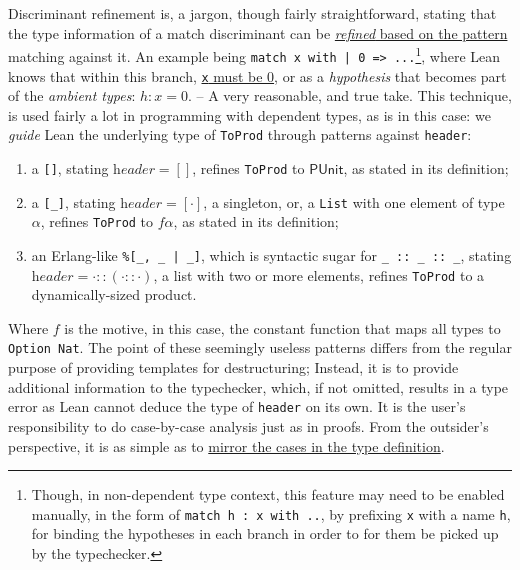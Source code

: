 \documentclass[a4paper, 11pt]{article}
\theoremstyle{remark}\newtheorem*{remark}{Remark}
\theoremstyle{definition}\newtheorem*{definition}{Definition}
\begin{document}
Discriminant refinement is, a jargon, though fairly straightforward,
stating that the type information of a match discriminant can be \underline{\emph{refined} based on the pattern}
matching against it. An example being \texttt{match x with | 0 => ...}\footnote{
Though, in non-dependent type context, this feature may need to be enabled manually, in the form of
\texttt{match h : x with ..}, by prefixing \texttt{x} with a name \texttt{h},
for binding the hypotheses in each branch
in order to for them be picked up by the typechecker.
},
where Lean knows
that within this branch, \underline{\texttt{x} must be 0}, or as a \emph{hypothesis} that becomes
part of the \emph{ambient types}: $h : x = 0$. -- A very reasonable, and true take. This technique,
is used fairly a lot in programming with dependent types, as is in this case: we \emph{guide} Lean
the underlying type of \texttt{ToProd} through patterns against \texttt{header}:
\begin{enumerate}
\item a \texttt{[]}, stating $\textit{header} = []$, refines \texttt{ToProd} to $\mathsf{PUnit}$,
as stated in its definition;
\item a \texttt{[\_]}, stating $\textit{header} = [\cdot]$, a singleton, or, a \texttt{List} with one element of type $\alpha$, refines \texttt{ToProd} to $f \alpha$,
as stated in its definition;
\item an Erlang-like \texttt{\%[\_, \_ | \_]}, which is syntactic sugar for \texttt{\_ :: \_ :: \_}, stating
$\textit{header} = \cdot :: (\cdot :: \cdot)$, a list with two or more elements, refines \texttt{ToProd} to
a dynamically-sized product.
\end{enumerate}
Where $f$ is the motive, in this case, the constant function that maps all types to \texttt{Option Nat}.
The point of these seemingly useless patterns
differs from the regular purpose of providing templates for destructuring; Instead, it is to
provide additional information to the typechecker, which,
if not omitted, results in a type error as Lean cannot deduce the type of \texttt{header} on its own.
It is the user's responsibility to do case-by-case analysis just as in proofs. From the outsider's
perspective, it is as simple as to \underline{mirror the cases in the type definition}.
\end{document}

